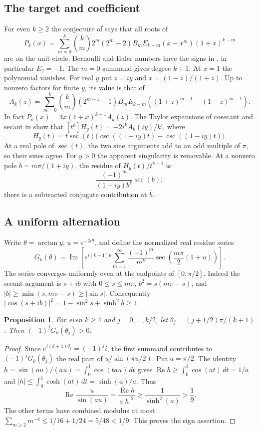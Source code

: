 \documentclass[11pt,a4paper]{article}
\numberwithin{equation}{section}
\newtheorem{proposition}[theorem]{Proposition}
\theoremstyle{definition}
\theoremstyle{remark}
\begin{document}
\subsection{The target and coefficient}
For even $k\ge2$ the conjecture of \cite[Conj.~2]{r44reiwa:LRR} says that all roots of
\[
 P_k(x)=\sum_{m=0}^k {k\choose m}2^m(2^m-2)B_mE_{k-m}(x-x^m)(1+x)^{k-m}
\]
are on the unit circle. Bernoulli and Euler numbers have the signs in \cite{r44reiwa:LRR}, in particular $E_2=-1$. The $m=0$ summand gives degree $k+1$. At $x=1$ the polynomial vanishes. For real $y$ put $z=iy$ and $x=(1-z)/(1+z)$. Up to nonzero factors for finite $y$, its value is that of
\[
 A_k(z)=\sum_{m=0}^k{k\choose m}(2^{m-1}-1)B_m E_{k-m}
 \left((1+z)^{m-1}-(1-z)^{m-1}\right).
\]
In fact $P_k(x)=4x(1+x)^{k-1} A_k(z)$. The Taylor expansions of cosecant and secant in \cite[proof of Thm.~3]{r44reiwa:LRR} show that $[t^k]H_y(t)=-2 i^k A_k(iy)/k!$, where
\[
 H_y(t)=t\sec(t)\bigl(\csc((1+iy)t)-\csc((1-iy)t)\bigr).
\]
At a real pole of $\sec(t)$, the two sine arguments add to an odd multiple of $\pi$, so their sines agree. For $y>0$ the apparent singularity is removable. At a nonzero pole $b=m\pi/(1+iy)$, the residue of $H_y(t)/t^{k+1}$ is
\[
 \frac{(-1)^m}{(1+iy)b^k}\sec(b);
\]
there is a subtracted conjugate contribution at $\bar b$.
\subsection{A uniform alternation}
Write $\theta=\arctan y$, $u=e^{-2i\theta}$, and define the normalized real residue series
\[
 G_k(\theta)=\operatorname{Im}\left[e^{i(k-1)\theta}
 \sum_{m=1}^\infty\frac{(-1)^m}{m^k}
 \sec\left(\frac{m\pi}{2}(1+u)\right)\right].
\]
The series converges uniformly even at the endpoints of $[0,\pi/2]$. Indeed the secant argument is $s+ib$ with $0\le s\le m\pi$, $b^2=s(m\pi-s)$, and $|b|\ge\min(s,m\pi-s)\ge |\sin s|$. Consequently $|\cos(s+ib)|^2=1-\sin^2s+\sinh^2 b\ge1$.

\begin{proposition}
For even $k\ge4$ and $j=0,\ldots,k/2$, let $\theta_j=(j+1/2)\pi/(k+1)$. Then $(-1)^jG_k(\theta_j)>0$.
\end{proposition}
\begin{proof}
Since $e^{i(k+1)\theta_j}=(-1)^j i$, the first summand contributes to $(-1)^j G_k(\theta_j)$ the real part of $u/\sin(\pi u/2)$. Put $a=\pi/2$. The identity $h=\sin(au)/(au)=\int_0^1\cos(tau)\,dt$ gives $\operatorname{Re}h\ge\int_0^1\cos(at)\,dt=1/a$ and $|h|\le\int_0^1\cosh(at)\,dt=\sinh(a)/a$. Thus
\[
 \operatorname{Re}\frac{u}{\sin(au)}=\frac{\operatorname{Re}h}{a|h|^2}
 \ge\frac{1}{\sinh^2(a)}>\frac19.
\]
The other terms have combined modulus at most $\sum_{m\ge2}m^{-4}\le 1/16+1/24=5/48<1/9$. This proves the sign assertion.
\end{proof}
\end{document}
